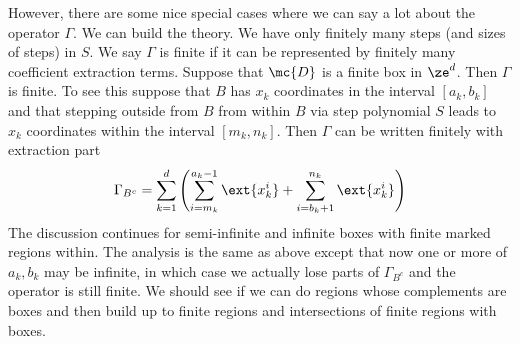 However, there are some nice special cases where we can say a lot about the operator $\Gamma$. We can build the theory. We have only finitely many steps (and sizes of steps) in $S$. We say $\Gamma$ is finite if it can be represented by finitely many coefficient extraction terms. Suppose that $\mc{D}$ is a finite box in $\ze^d$. Then $\Gamma$ is finite. To see this suppose that $B$ has $x_k$ coordinates in the interval $[a_k,b_k]$ and that stepping outside from $B$ from within $B$ via step polynomial $S$ leads to $x_k$ coordinates within the interval $[m_k,n_k]$. Then $\Gamma$ can be written finitely with extraction part
\begin{align}
	\Gamma_{B^c} = \sum_{k=1}^{d} \left(\sum_{i= m_k}^{a_k-1}\ext{x_k^i}+\sum_{i= b_k+1}^{n_k}\ext{x_k^i}\right)
\end{align}
 The discussion continues for semi-infinite and infinite boxes with finite marked regions within. The analysis is the same as above except that now one or more of $a_k, b_k$ may be infinite, in which case we actually lose parts of $\Gamma_{B^c}$ and the operator is still finite. We should see if we can do regions whose complements are boxes and then build up to finite regions and intersections of finite regions with boxes.


